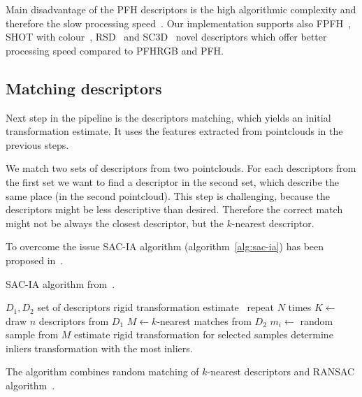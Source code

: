 Main disadvantage of the \gls{PFH} descriptors is the high algorithmic complexity and therefore the slow processing speed~\citet{rusu2009fpfh}. Our implementation supports also \gls{FPFH}~\citet{rusu2009fpfh}, \gls{SHOT} with colour~\citet{tombari2011shot}, \gls{RSD}~\citet{marton2010rsd} and \gls{SC3D}~\citet{frome2004sc3d} novel descriptors which offer better processing speed compared to \gls{PFHRGB} and \gls{PFH}.

\subsection{Matching descriptors}
\label{sec:matching}

Next step in the pipeline is the descriptors matching, which yields an initial transformation estimate. It uses the features extracted from pointclouds in the previous steps.

We match two sets of descriptors from two pointclouds. For each descriptors from the first set we want to find a descriptor in the second set, which describe the same place (in the second pointcloud). This step is challenging, because the descriptors might be less descriptive than desired. Therefore the correct match might not be always the closest descriptor, but the $k$-nearest descriptor.

To overcome the issue \gls{SAC-IA} algorithm (algorithm~\ref{alg:sac-ia}) has been proposed in~\citet{rusu2009fpfh}.

\begin{algorithm}
    \caption[\gls{SAC-IA}]{\gls{SAC-IA} algorithm from~\citet{rusu2009fpfh}.}
    \label{alg:sac-ia}
    \begin{algorithmic}[1]
        \Require $D_1, D_2$ set of descriptors
        \Ensure rigid transformation estimate
            \Loop~repeat $N$ times
                \State $K \gets$ draw $n$ descriptors from $D_1$
                    \State $M \gets k$-nearest matches from $D_2$
                    \State $m_i \gets$ random sample from $M$
                \EndFor
                \State estimate rigid transformation for selected samples
                \State determine inliers
            \EndLoop
            \State \Return transformation with the most inliers.
        \EndFunction
    \end{algorithmic}
\end{algorithm}

The algorithm combines random matching of $k$-nearest descriptors and \gls{RANSAC} algorithm~\citet{fischler1981ransac}.

